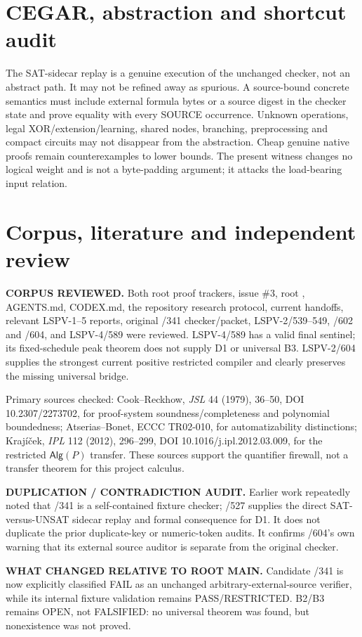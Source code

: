 \documentclass[11pt]{article}
\begin{document}
\section*{CEGAR, abstraction and shortcut audit}
The SAT-sidecar replay is a genuine execution of the unchanged checker, not an abstract path. It may not be refined away as spurious. A source-bound concrete semantics must include external formula bytes or a source digest in the checker state and prove equality with every SOURCE occurrence. Unknown operations, legal XOR/extension/learning, shared nodes, branching, preprocessing and compact circuits may not disappear from the abstraction. Cheap genuine native proofs remain counterexamples to lower bounds. The present witness changes no logical weight and is not a byte-padding argument; it attacks the load-bearing input relation.

\section*{Corpus, literature and independent review}
\textbf{CORPUS REVIEWED.} Both root proof trackers, issue \#3, root , AGENTS.md, CODEX.md, the repository research protocol, current handoffs, relevant LSPV-1--5 reports, original /341 checker/packet, LSPV-2/539--549, /602 and /604, and LSPV-4/589 were reviewed. LSPV-4/589 has a valid final sentinel; its fixed-schedule peak theorem does not supply D1 or universal B3. LSPV-2/604 supplies the strongest current positive restricted compiler and clearly preserves the missing universal bridge.

Primary sources checked: Cook--Reckhow, \emph{JSL} 44 (1979), 36--50, DOI 10.2307/2273702, for proof-system soundness/completeness and polynomial boundedness; Atserias--Bonet, ECCC TR02-010, for automatizability distinctions; Kraj\'i\v cek, \emph{IPL} 112 (2012), 296--299, DOI 10.1016/j.ipl.2012.03.009, for the restricted $\mathsf{Alg}(P)$ transfer. These sources support the quantifier firewall, not a transfer theorem for this project calculus.

\textbf{DUPLICATION / CONTRADICTION AUDIT.} Earlier work repeatedly noted that /341 is a self-contained fixture checker; /527 supplies the direct SAT-versus-UNSAT sidecar replay and formal consequence for D1. It does not duplicate the prior duplicate-key or numeric-token audits. It confirms /604's own warning that its external source auditor is separate from the original checker.

\textbf{WHAT CHANGED RELATIVE TO ROOT MAIN.} Candidate /341 is now explicitly classified FAIL as an unchanged arbitrary-external-source verifier, while its internal fixture validation remains PASS/RESTRICTED. B2/B3 remains OPEN, not FALSIFIED: no universal theorem was found, but nonexistence was not proved.
\end{document}
